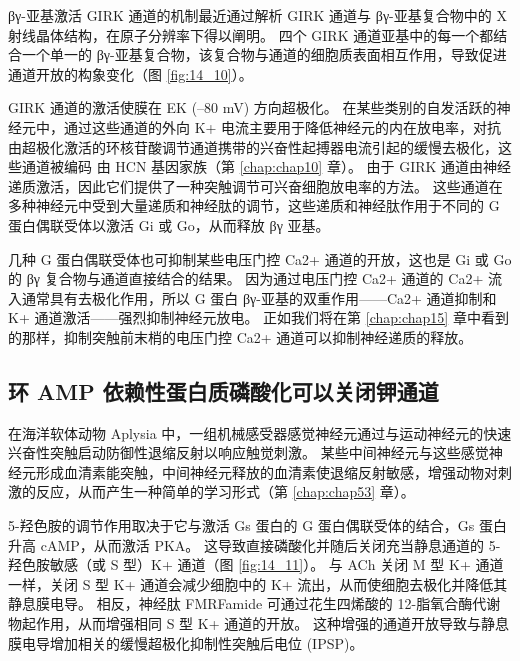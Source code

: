 βγ-亚基激活 GIRK 通道的机制最近通过解析 GIRK 通道与 βγ-亚基复合物中的 X 射线晶体结构，在原子分辨率下得以阐明。 
四个 GIRK 通道亚基中的每一个都结合一个单一的 βγ-亚基复合物，该复合物与通道的细胞质表面相互作用，导致促进通道开放的构象变化（图 \ref{fig:14_10}）。


GIRK 通道的激活使膜在 EK (–80 mV) 方向超极化。 
在某些类别的自发活跃的神经元中，通过这些通道的外向 K+ 电流主要用于降低神经元的内在放电率，对抗由超极化激活的环核苷酸调节通道携带的兴奋性起搏器电流引起的缓慢去极化，这些通道被编码 由 HCN 基因家族（第 \ref{chap:chap10} 章）。 
由于 GIRK 通道由神经递质激活，因此它们提供了一种突触调节可兴奋细胞放电率的方法。 
这些通道在多种神经元中受到大量递质和神经肽的调节，这些递质和神经肽作用于不同的 G 蛋白偶联受体以激活 Gi 或 Go，从而释放 βγ 亚基。


几种 G 蛋白偶联受体也可抑制某些电压门控 Ca2+ 通道的开放，这也是 Gi 或 Go 的 βγ 复合物与通道直接结合的结果。 
因为通过电压门控 Ca2+ 通道的 Ca2+ 流入通常具有去极化作用，所以 G 蛋白 βγ-亚基的双重作用——Ca2+ 通道抑制和 K+ 通道激活——强烈抑制神经元放电。 
正如我们将在第 \ref{chap:chap15} 章中看到的那样，抑制突触前末梢的电压门控 Ca2+ 通道可以抑制神经递质的释放。


\subsection{环 AMP 依赖性蛋白质磷酸化可以关闭钾通道}

在海洋软体动物 Aplysia 中，一组机械感受器感觉神经元通过与运动神经元的快速兴奋性突触启动防御性退缩反射以响应触觉刺激。 
某些中间神经元与这些感觉神经元形成血清素能突触，中间神经元释放的血清素使退缩反射敏感，增强动物对刺激的反应，从而产生一种简单的学习形式（第 \ref{chap:chap53} 章）。


5-羟色胺的调节作用取决于它与激活 Gs 蛋白的 G 蛋白偶联受体的结合，Gs 蛋白升高 cAMP，从而激活 PKA。 
这导致直接磷酸化并随后关闭充当静息通道的 5-羟色胺敏感（或 S 型）K+ 通道（图 \ref{fig:14_11}）。 
与 ACh 关闭 M 型 K+ 通道一样，关闭 S 型 K+ 通道会减少细胞中的 K+ 流出，从而使细胞去极化并降低其静息膜电导。 
相反，神经肽 FMRFamide 可通过花生四烯酸的 12-脂氧合酶代谢物起作用，从而增强相同 S 型 K+ 通道的开放。 
这种增强的通道开放导致与静息膜电导增加相关的缓慢超极化抑制性突触后电位 (IPSP)。

